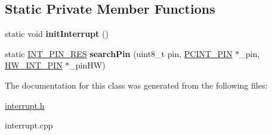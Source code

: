 \subsection*{Static Private Member Functions}
\begin{DoxyCompactItemize}
\item 
\mbox{\label{classInterrupt_acf51bc7c69619e4ccd95e90ff31aa286}} 
static void {\bfseries init\+Interrupt} ()
\item 
\mbox{\label{classInterrupt_a262ad3f1bb4a5cdf24a356b20d037a56}} 
static \hyperlink{interrupt_8h_a530c4d3ebd7cd9fb12aba6242e88d494}{I\+N\+T\+\_\+\+P\+I\+N\+\_\+\+R\+ES} {\bfseries search\+Pin} (uint8\+\_\+t pin, \hyperlink{structPCINT__PIN}{P\+C\+I\+N\+T\+\_\+\+P\+IN} $\ast$\+\_\+pin, \hyperlink{structHW__INT__PIN}{H\+W\+\_\+\+I\+N\+T\+\_\+\+P\+IN} $\ast$\+\_\+pin\+HW)
\end{DoxyCompactItemize}


The documentation for this class was generated from the following files\+:\begin{DoxyCompactItemize}
\item 
\hyperlink{interrupt_8h}{interrupt.\+h}\item 
interrupt.\+cpp\end{DoxyCompactItemize}
